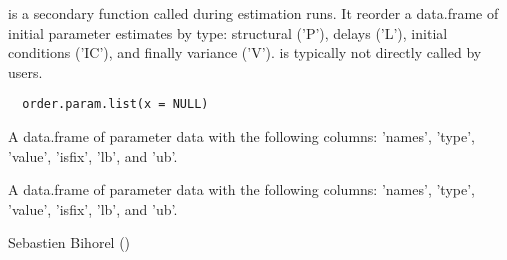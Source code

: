 %
\begin{Description}\relax
{} is a secondary function called during estimation runs.
It reorder a data.frame of initial parameter estimates by type: structural
('P'), delays ('L'), initial conditions ('IC'), and finally variance ('V').
 is typically not directly called by users.
\end{Description}
%
\begin{Usage}
\begin{verbatim}
  order.param.list(x = NULL)
\end{verbatim}
\end{Usage}
%
\begin{Arguments}
\begin{ldescription}
\item[\code{x}] A data.frame of parameter data with the following columns: 'names', 
'type', 'value', 'isfix', 'lb', and 'ub'.
\end{ldescription}
\end{Arguments}
%
\begin{Value}
A data.frame of parameter data with the following columns: 'names', 'type', 
'value', 'isfix', 'lb', and 'ub'.
\end{Value}
%
\begin{Author}\relax
Sebastien Bihorel ()
\end{Author}
